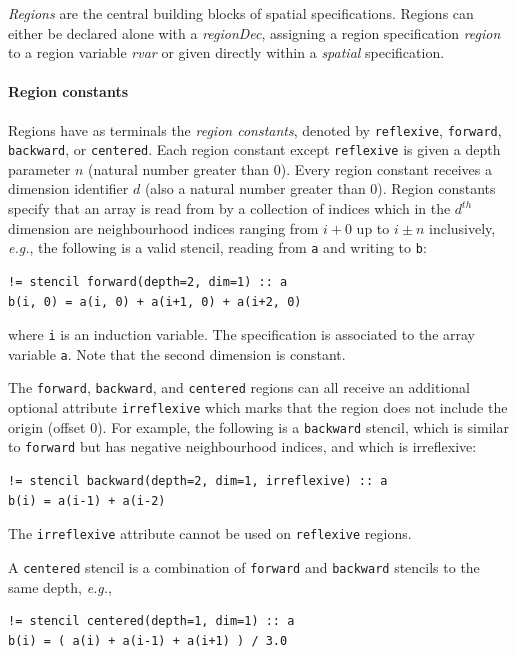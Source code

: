 \documentclass[9pt,preprint]{sigplanconf}
\newcounter{block}
\theoremstyle{definition}
\newcommand{\eg}{\emph{e.g.}}
\newcommand{\nonterm}[1]{\textit{#1}}
\newcommand{\term}[1]{\texttt{#1}}
\begin{document}
\emph{Regions} are the central building blocks of spatial
specifications. Regions can either be declared alone with a
\nonterm{regionDec}, assigning a region specification \nonterm{region} to
a region variable \nonterm{rvar} or given directly within a
\nonterm{spatial} specification.

\paragraph{Region constants}

Regions have as terminals the \emph{region constants}, denoted by
\term{reflexive}, \term{forward}, \term{backward}, or \term{centered}. Each
region constant except \term{reflexive} is given a depth parameter $n$ (natural
number greater than 0). Every region constant receives a dimension identifier $d$ (also a
natural number greater than 0). Region constants specify that an array is read
from by a collection of indices which in the $d^{th}$ dimension are
neighbourhood indices ranging from $i + 0$ up to $i \pm n$ inclusively,
\eg{}, the following is a valid stencil, reading from \term{a} and writing to
\term{b}:
\begin{verbatim}
!= stencil forward(depth=2, dim=1) :: a
b(i, 0) = a(i, 0) + a(i+1, 0) + a(i+2, 0)
\end{verbatim}
where \texttt{i} is an induction variable.  The specification
is associated to the array variable \texttt{a}. Note that the second
dimension is constant.

The \term{forward},
\term{backward}, and \term{centered} regions can all receive an
additional optional attribute \term{irreflexive} which marks
that the region does not include the origin (offset 0).
For example, the following is a \term{backward} stencil, which is similar
to \term{forward} but has negative neighbourhood indices, and which
is irreflexive:
%
\begin{verbatim}
!= stencil backward(depth=2, dim=1, irreflexive) :: a
b(i) = a(i-1) + a(i-2)
\end{verbatim}
%
The \term{irreflexive} attribute cannot be used on \term{reflexive}
regions.

A \texttt{centered} stencil is a combination of \texttt{forward}
and \texttt{backward} stencils to the same depth, \eg{},
\begin{verbatim}
!= stencil centered(depth=1, dim=1) :: a
b(i) = ( a(i) + a(i-1) + a(i+1) ) / 3.0
\end{verbatim}
\end{document}
